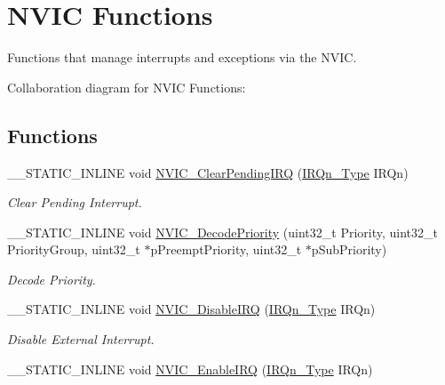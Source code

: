 \hypertarget{group__CMSIS__Core__NVICFunctions}{}\section{N\+V\+IC Functions}
\label{group__CMSIS__Core__NVICFunctions}


Functions that manage interrupts and exceptions via the N\+V\+IC.  


Collaboration diagram for N\+V\+IC Functions\+:
\subsection*{Functions}
\begin{DoxyCompactItemize}
\item 
\+\_\+\+\_\+\+S\+T\+A\+T\+I\+C\+\_\+\+I\+N\+L\+I\+NE void \hyperlink{group__CMSIS__Core__NVICFunctions_ga332e10ef9605dc6eb10b9e14511930f8}{N\+V\+I\+C\+\_\+\+Clear\+Pending\+I\+RQ} (\hyperlink{group__CMSIS__175X__6X__IRQ_gaaaeafe7bd8401a46d55e8431b6326116}{I\+R\+Qn\+\_\+\+Type} I\+R\+Qn)
\begin{DoxyCompactList}\small\item\em Clear Pending Interrupt. \end{DoxyCompactList}\item 
\+\_\+\+\_\+\+S\+T\+A\+T\+I\+C\+\_\+\+I\+N\+L\+I\+NE void \hyperlink{group__CMSIS__Core__NVICFunctions_ga4f23ef94633f75d3c97670a53949003c}{N\+V\+I\+C\+\_\+\+Decode\+Priority} (uint32\+\_\+t Priority, uint32\+\_\+t Priority\+Group, uint32\+\_\+t $\ast$p\+Preempt\+Priority, uint32\+\_\+t $\ast$p\+Sub\+Priority)
\begin{DoxyCompactList}\small\item\em Decode Priority. \end{DoxyCompactList}\item 
\+\_\+\+\_\+\+S\+T\+A\+T\+I\+C\+\_\+\+I\+N\+L\+I\+NE void \hyperlink{group__CMSIS__Core__NVICFunctions_ga260fba04ac8346855c57f091d4ee1e71}{N\+V\+I\+C\+\_\+\+Disable\+I\+RQ} (\hyperlink{group__CMSIS__175X__6X__IRQ_gaaaeafe7bd8401a46d55e8431b6326116}{I\+R\+Qn\+\_\+\+Type} I\+R\+Qn)
\begin{DoxyCompactList}\small\item\em Disable External Interrupt. \end{DoxyCompactList}\item 
\+\_\+\+\_\+\+S\+T\+A\+T\+I\+C\+\_\+\+I\+N\+L\+I\+NE void \hyperlink{group__CMSIS__Core__NVICFunctions_ga3349f2e3580d7ce22d6530b7294e5921}{N\+V\+I\+C\+\_\+\+Enable\+I\+RQ} (\hyperlink{group__CMSIS__175X__6X__IRQ_gaaaeafe7bd8401a46d55e8431b6326116}{I\+R\+Qn\+\_\+\+Type} I\+R\+Qn)

\end{DoxyCompactItemize}
